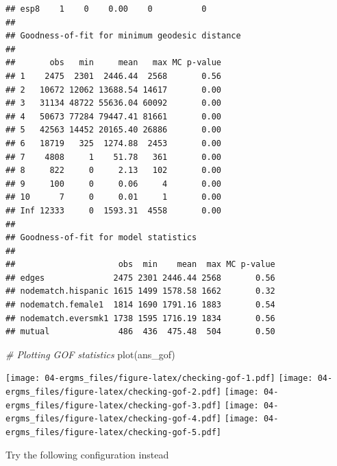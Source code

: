 \documentclass[
]{book}
\newenvironment{Shaded}{\begin{snugshade}}{\end{snugshade}}
\newcommand{\CommentTok}[1]{\textcolor[rgb]{0.56,0.35,0.01}{\textit{#1}}}
\newcommand{\FunctionTok}[1]{\textcolor[rgb]{0.00,0.00,0.00}{#1}}
\newcommand{\NormalTok}[1]{#1}
\begin{document}
\begin{verbatim}
## esp8    1    0    0.00    0          0
## 
## Goodness-of-fit for minimum geodesic distance 
## 
##       obs   min     mean   max MC p-value
## 1    2475  2301  2446.44  2568       0.56
## 2   10672 12062 13688.54 14617       0.00
## 3   31134 48722 55636.04 60092       0.00
## 4   50673 77284 79447.41 81661       0.00
## 5   42563 14452 20165.40 26886       0.00
## 6   18719   325  1274.88  2453       0.00
## 7    4808     1    51.78   361       0.00
## 8     822     0     2.13   102       0.00
## 9     100     0     0.06     4       0.00
## 10      7     0     0.01     1       0.00
## Inf 12333     0  1593.31  4558       0.00
## 
## Goodness-of-fit for model statistics 
## 
##                     obs  min    mean  max MC p-value
## edges              2475 2301 2446.44 2568       0.56
## nodematch.hispanic 1615 1499 1578.58 1662       0.32
## nodematch.female1  1814 1690 1791.16 1883       0.54
## nodematch.eversmk1 1738 1595 1716.19 1834       0.56
## mutual              486  436  475.48  504       0.50
\end{verbatim}

\begin{Shaded}
\begin{Highlighting}[]
\CommentTok{\# Plotting GOF statistics}
\FunctionTok{plot}\NormalTok{(ans\_gof)}
\end{Highlighting}
\end{Shaded}

\texttt{[image: 04-ergms\_files/figure-latex/checking-gof-1.pdf]} \texttt{[image: 04-ergms\_files/figure-latex/checking-gof-2.pdf]} \texttt{[image: 04-ergms\_files/figure-latex/checking-gof-3.pdf]} \texttt{[image: 04-ergms\_files/figure-latex/checking-gof-4.pdf]} \texttt{[image: 04-ergms\_files/figure-latex/checking-gof-5.pdf]}

Try the following configuration instead
\end{document}
